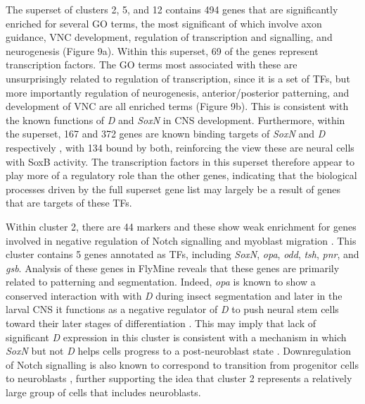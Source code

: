 \documentclass[withindex,glossary]{cam-thesis}
\begin{document}
The superset of clusters 2, 5, and 12 contains 494 genes that are
significantly enriched for several GO terms, the most significant of
which involve axon guidance, VNC development, regulation of
transcription and signalling, and neurogenesis (Figure 9a). Within this
superset, 69 of the genes represent transcription factors. The GO terms
most associated with these are unsurprisingly related to regulation of
transcription, since it is a set of TFs, but more importantly regulation
of neurogenesis, anterior/posterior patterning, and development of VNC
are all enriched terms (Figure 9b). This is consistent with the known
functions of \emph{D} and \emph{SoxN} in CNS development. Furthermore,
within the superset, 167 and 372 genes are known binding targets of
\emph{SoxN} and \emph{D} respectively , with 134 bound by both, reinforcing the view these are
neural cells with SoxB activity. The transcription factors in this
superset therefore appear to play more of a regulatory role than the
other genes, indicating that the biological processes driven by the full
superset gene list may largely be a result of genes that are targets of
these TFs.

Within cluster 2, there are 44 markers and these show weak enrichment
for genes involved in negative regulation of Notch signalling and
myoblast migration . This cluster contains 5 genes annotated as TFs,
including \emph{SoxN}, \emph{opa}, \emph{odd}, \emph{tsh}, \emph{pnr},
and \emph{gsb}. Analysis of these genes in FlyMine 
reveals that these genes are primarily related to patterning and
segmentation. Indeed, \emph{opa} is known to show a conserved
interaction with with \emph{D} during insect segmentation  and later in the larval CNS it functions as a negative
regulator of \emph{D} to push neural stem cells toward their later
stages of differentiation . This may imply
that lack of significant \emph{D} expression in this cluster is
consistent with a mechanism in which \emph{SoxN} but not \emph{D} helps
cells progress to a post-neuroblast state .
Downregulation of Notch signalling is also known to correspond to
transition from progenitor cells to neuroblasts , further supporting the idea that cluster 2 represents a
relatively large group of cells that includes neuroblasts.
\end{document}
